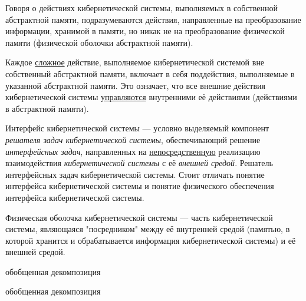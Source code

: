 Говоря о действиях кибернетической системы, выполняемых в собственной абстрактной памяти, подразумеваются действия, направленные на преобразование информации, хранимой в памяти, но никак не на преобразование физической памяти (физической оболочки абстрактной памяти).

Каждое \uline{сложное} действие, выполняемое кибернетической системой вне собственный абстрактной памяти, включает в себя поддействия, выполняемые в указанной абстрактной памяти. 
Это означает, что все внешние действия кибернетической системы \uline{управляются} внутренними её действиями (действиями в абстрактной памяти).


Интерфейс кибернетической системы --- условно выделяемый компонент \textit{решателя задач кибернетической системы}, обеспечивающий решение \textit{интерфейсных задач}, направленных на \uline{непосредственную} реализацию взаимодействия \textit{кибернетической системы} с её \textit{внешней средой}. Решатель интерфейсных задач кибернетической системы. Стоит отличать понятие интерфейса кибернетической системы и понятие физического обеспечения интерфейса кибернетической системы.

Физическая оболочка кибернетической системы --- часть кибернетической системы, являющаяся "посредником"{} между её внутренней средой (памятью, в которой хранится и обрабатывается информация кибернетической системы) и её внешней средой.

\begin{SCn}
	\begin{scnrelfromset}{обобщенная декомпозиция}
	\end{scnrelfromset}
\end{SCn}


\begin{SCn}
	\begin{scnrelfromset}{обобщенная декомпозиция}
	\end{scnrelfromset}
\end{SCn}

